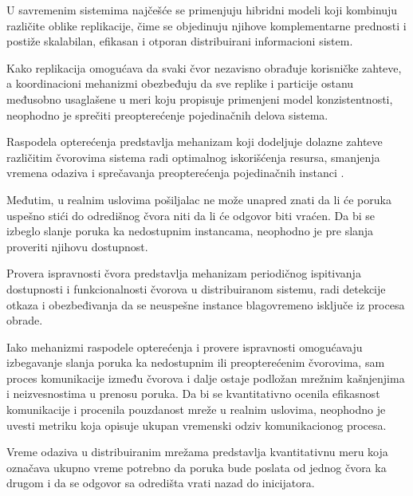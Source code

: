 U savremenim sistemima najčešće se primenjuju hibridni modeli koji kombinuju različite oblike replikacije, čime se objedinuju njihove komplementarne prednosti i postiže skalabilan, efikasan i otporan distribuirani informacioni sistem.

Kako replikacija omogućava da svaki čvor nezavisno obrađuje korisničke zahteve, a koordinacioni mehanizmi obezbeđuju da sve replike i particije ostanu međusobno usaglašene u meri koju propisuje primenjeni model konzistentnosti, neophodno je sprečiti preopterećenje pojedinačnih delova sistema.

\begin{definicija}
Raspodela opterećenja  predstavlja mehanizam koji dodeljuje dolazne zahteve različitim čvorovima sistema radi optimalnog iskorišćenja resursa, smanjenja vremena odaziva i sprečavanja preopterećenja pojedinačnih instanci \cite{chou2006load}.
\end{definicija}

Međutim, u realnim uslovima pošiljalac ne može unapred znati da li će poruka uspešno stići do odredišnog čvora niti da li će odgovor biti vraćen. Da bi se izbeglo slanje poruka ka nedostupnim instancama, neophodno je pre slanja proveriti njihovu dostupnost.

\begin{definicija}
Provera ispravnosti čvora  predstavlja mehanizam periodičnog ispitivanja dostupnosti i funkcionalnosti čvorova u distribuiranom sistemu, radi detekcije otkaza i obezbeđivanja da se neuspešne instance blagovremeno isključe iz procesa obrade.
\end{definicija}

Iako mehanizmi raspodele opterećenja i provere ispravnosti omogućavaju izbegavanje slanja poruka ka nedostupnim ili preopterećenim čvorovima, sam proces komunikacije između čvorova i dalje ostaje podložan mrežnim kašnjenjima i neizvesnostima u prenosu poruka. Da bi se kvantitativno ocenila efikasnost komunikacije i procenila pouzdanost mreže u realnim uslovima, neophodno je uvesti metriku koja opisuje ukupan vremenski odziv komunikacionog procesa.

\begin{definicija}
Vreme odaziva  u distribuiranim mrežama predstavlja kvantitativnu meru koja označava ukupno vreme potrebno da poruka bude poslata od jednog čvora ka drugom i da se odgovor sa odredišta vrati nazad do inicijatora.
\end{definicija}


